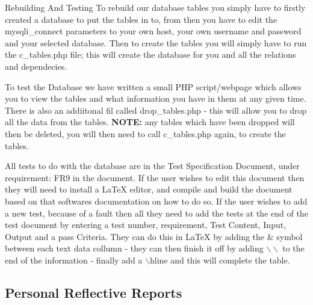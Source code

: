 \documentclass[12pt]{article}
\makeatletter
\renewcommand{\paragraph}{
  \@startsection{paragraph}{4}
  {\z@}{3.25ex \@plus -10em \@minus 1em}{0.1em}
  {\normalfont\normalsize\bfseries}
}
\makeatother
\begin{document}
\paragraph{Rebuilding And Testing}
To rebuild our database tables you simply have to firstly created a database to put the tables in to, from then you have to edit the mysqli\_connect parameters to your own host, your own username and password and your selected database. Then to create the tables you will simply have to run the c\_tables.php file; this will create the database for you and all the relations and dependecies.

To test the Database we have written a small PHP script/webpage which allows you to view the tables and what information you have in them at any given time. There is also an addiitonal fil called drop\_tables.php - this will allow you to drop all the data from the tables. \textbf{NOTE:} any tables which have been dropped will then be deleted, you will then need to call c\_tables.php again, to create the tables.

All tests to do with the database are in the Test Specification Document, under requirement: FR9 in the document. If the user wishes to edit this document then they will need to install a LaTeX editor,  and compile and build the document based on that softwares documentation on how to do so. If the user wishes to add a new test, because of a fault then all they need to add the tests at the end of the test document by entering a test number, requirement, Test Content, Input, Output and a pass Criteria. They can do this in LaTeX by adding the \& symbol between each text data collumn - they can then finish it off by adding $\backslash \backslash$ to the end of the information - finally add a $\backslash$hline and this will complete the table. 
\newpage
\subsection{Personal Reflective Reports}
\end{document}
